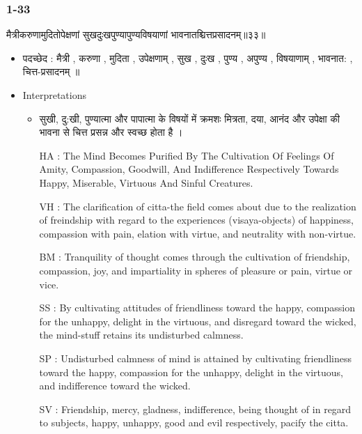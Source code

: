 \begin{frame}[fragile]\frametitle{1-33}
\begin{sanskrit}
मैत्रीकरुणामुदितोपेक्षणां सुखदुःखपुण्यापुण्यविषयाणां भावनातश्चित्तप्रसादनम्॥३३॥
\end{sanskrit}

	\begin{itemize}
	\item पदच्छेद : मैत्री , करुणा , मुदिता , उपेक्षणाम् , सुख , दुःख , पुण्य , अपुण्य , विषयाणाम् , भावनात: , चित्त-प्रसादनम् ॥
	\item Interpretations
		\begin{itemize}	
		\item सुखी, दु:खी, पुण्यात्मा और पापात्मा के विषयों में क्रमशः मित्रता, दया, आनंद और उपेक्षा की भावना से चित्त प्रसन्न और स्वच्छ होता है ।
		\item [HA]: The Mind Becomes Purified By The Cultivation Of Feelings Of Amity, Compassion, Goodwill, And Indifference Respectively Towards Happy, Miserable, Virtuous And Sinful Creatures.
		\item [VH]: The clarification of citta-the field comes about due to the realization of freindship with regard to the experiences (visaya-objects) of happiness, compassion with pain, elation with virtue, and neutrality with non-virtue.
		\item [BM]: Tranquility of thought comes through the cultivation of friendship, compassion, joy, and impartiality in spheres of pleasure or pain, virtue or vice.
		\item [SS]: By cultivating attitudes of friendliness toward the happy, compassion for the unhappy, delight in the virtuous, and disregard toward the wicked, the mind-stuff retains its undisturbed calmness.
		\item [SP]: Undisturbed calmness of mind is attained by cultivating friendliness toward the happy, compassion for the unhappy, delight in the virtuous, and indifference toward the wicked.
		\item [SV]: Friendship, mercy, gladness, indifference, being thought of in regard to subjects, happy, unhappy, good and evil respectively, pacify the citta. 
		\end{itemize}
	\end{itemize}	
\end{frame}

